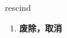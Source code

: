 
\begin{frame}
{\huge rescind}
\begin{center}
\begin{enumerate}\Large
  \item \textbf{废除，取消}
\end{enumerate}
\end{center}
\end{frame}
